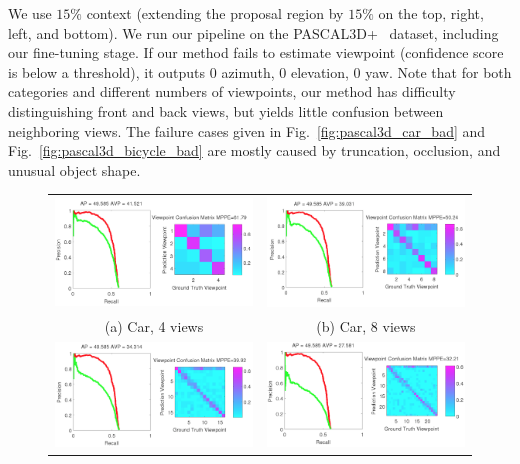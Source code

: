 \documentclass[10pt,twocolumn,letterpaper]{article}
\begin{document}
We use $15\%$ context (extending the proposal region by $15\%$ on the
top, right, left, and bottom). We run our pipeline on the
PASCAL3D+~\cite{Xiang14} dataset, including our fine-tuning stage.
%
If our method fails to estimate viewpoint (confidence score is below a
threshold), it outputs 0 azimuth, 0 elevation, 0 yaw. Note that for
both categories and different numbers of viewpoints, our method has
difficulty distinguishing front and back views, but yields little
confusion between neighboring views. The failure cases given in
Fig.~\ref{fig:pascal3d_car_bad} and
Fig.~\ref{fig:pascal3d_bicycle_bad} are mostly caused by truncation,
occlusion, and unusual object shape.
%
\begin{figure}[h]
  \centering
  \begin{tabular}{cc}
  \includegraphics[width=0.45\linewidth]{car_cnn4_crop.png}&
  \includegraphics[width=0.45\linewidth]{car_cnn8_crop.png}\\
    (a) Car, 4 views&
    (b) Car, 8 views\\
  \includegraphics[width=0.45\linewidth]{car_cnn16_crop.png}&
  \includegraphics[width=0.45\linewidth]{car_cnn24_crop.png}\\

\end{tabular}
\end{figure}
\end{document}
